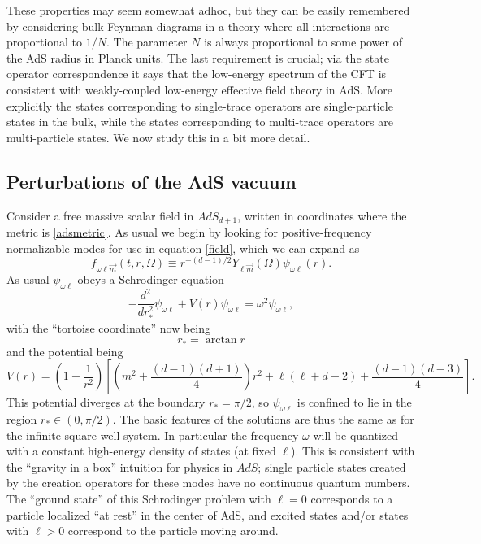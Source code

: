 \documentclass[12pt]{article}
\newcommand{\be}{\begin{equation}}
\newcommand{\ee}{\end{equation}}
\begin{document}
These properties may seem somewhat adhoc, but they can be easily remembered by considering bulk Feynman diagrams in a theory where all interactions are proportional to $1/N$.  The parameter $N$ is always proportional to some power of the AdS radius in Planck units.  The last requirement is crucial; via the state operator correspondence it says that the low-energy spectrum of the CFT is consistent with weakly-coupled low-energy effective field theory in AdS.  More explicitly the states corresponding to single-trace operators are single-particle states in the bulk, while the states corresponding to multi-trace operators are multi-particle states.  We now study this in a bit more detail.  

\subsection{Perturbations of the AdS vacuum}\label{adspertsec}   
Consider a free massive scalar field in $AdS_{d+1}$, written in coordinates where the metric is \eqref{adsmetric}.  As usual we begin by looking for positive-frequency normalizable modes for use in equation \eqref{field}, which we can expand as
\be\label{adsmoded}
f_{\omega\ell \vec{m}}(t,r,\Omega)\equiv r^{-(d-1)/2}Y_{\ell \vec{m}}(\Omega) \psi_{\omega \ell}(r).
\ee
As usual $\psi_{\omega\ell}$ obeys a Schrodinger equation
\be\label{adsschr}
-\frac{d^2}{dr_*^2}\psi_{\omega\ell}+V(r)\psi_{\omega\ell}=\omega^2 \psi_{\omega\ell},
\ee
with the ``tortoise coordinate''  now being
\be
r_*=\arctan r
\ee
and the potential being
\be
V(r)=\left(1+\frac{1}{r^2}\right)\left[\left(m^2+\frac{(d-1)(d+1)}{4}\right)r^2+\ell(\ell+d-2)+\frac{(d-1)(d-3)}{4}\right].
\ee
This potential diverges at the boundary $r_*=\pi/2$, so $\psi_{\omega \ell}$ is confined to lie in the region $r_*\in (0,\pi/2)$.  The basic features of the solutions are thus the same as for the infinite square well system.  In particular the frequency $\omega$ will be quantized with a constant high-energy density of states (at fixed $\ell$).  This is consistent with the ``gravity in a box'' intuition for physics in $AdS$; single particle states created by the creation operators for these modes have no continuous quantum numbers.  The ``ground state'' of this Schrodinger problem with $\ell=0$ corresponds to a particle localized ``at rest'' in the center of AdS, and excited states and/or states with $\ell>0$ correspond to the particle moving around. 
\end{document}
